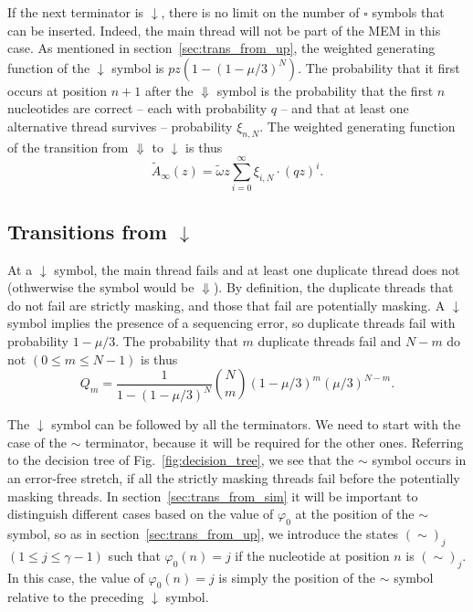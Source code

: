 \documentclass{article}
\begin{document}
If the next terminator is $\downarrow$, there is no limit on the number of
$\square$ symbols that can be inserted. Indeed, the main thread will not
be part of the MEM in this case. As mentioned in
section~\ref{sec:trans_from_up}, the weighted generating function of the
$\downarrow$ symbol is $pz(1-(1-\mu/3)^N)$. The probability that it first
occurs at position $n+1$ after the $\Downarrow$ symbol is the probability
that the first $n$ nucleotides are correct -- each with probability $q$
-- and that at least one alternative thread survives -- probability
$\xi_{n,N}$. The weighted generating function of the transition from
$\Downarrow$ to $\downarrow$ is thus
\begin{equation}
\tilde{A}_\infty(z) = \tilde{\omega} z
  \sum_{i=0}^\infty \xi_{i,N} \cdot (qz)^i.
\end{equation}

\subsection{Transitions from $\downarrow$}
\label{sec:trans_from_down}

At a $\downarrow$ symbol, the main thread fails and at least one duplicate
thread does not (othwerwise the symbol would be $\Downarrow$). By
definition, the duplicate threads that do not fail are strictly masking,
and those that fail are potentially masking. A $\downarrow$ symbol implies
the presence of a sequencing error, so duplicate threads fail with
probability $1-\mu/3$. The probability that $m$ duplicate threads fail and
$N-m$ do not $(0 \leq m \leq N-1)$ is thus
\begin{equation}
  Q_m = \frac{1}{1-(1-\mu/3)^N}{N \choose m} (1-\mu/3)^m(\mu/3)^{N-m}.
\end{equation}

The $\downarrow$ symbol can be followed by all the terminators. We need to
start with the case of the $\sim$ terminator, because it will be required
for the other ones. Referring to the decision tree of
Fig.~\ref{fig:decision_tree}, we see that the $\sim$ symbol occurs in an
error-free stretch, if all the strictly masking threads fail before the
potentially masking threads. In section~\ref{sec:trans_from_sim} it will
be important to distinguish different cases based on the value of
$\varphi_0$ at the position of the $\sim$ symbol, so as in
section~\ref{sec:trans_from_up}, we introduce the states $(\sim)_j$ $(1
\leq j \leq \gamma-1)$ such that $\varphi_0(n) = j$ if the nucleotide at
position $n$ is $(\sim)_j$. In this case, the value of $\varphi_0(n) = j$
is simply the position of the $\sim$ symbol relative to the preceding
$\downarrow$ symbol.
\end{document}
